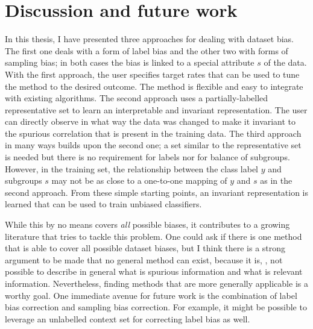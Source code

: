 \chapter{Discussion and future work}\label{ch:conclusion}
In this thesis, I have presented three approaches for dealing with dataset bias.
The first one deals with a form of label bias and the other two with forms of sampling bias;
in both cases the bias is linked to a special attribute \(s\) of the data.
%
%
With the first approach, the user specifies target rates that can be used to tune the method to the desired outcome.
The method is flexible and easy to integrate with existing algorithms.
The second approach uses a partially-labelled representative set to learn an interpretable and invariant representation.
The user can directly observe in what way the data was changed to make it invariant
to the spurious correlation that is present in the training data.
The third approach in many ways builds upon the second one;
a set similar to the representative set is needed but there is no requirement for labels nor for balance of subgroups.
However, in the training set, the relationship between the class label \(y\) and subgroups \(s\) may not be
as close to a one-to-one mapping of \(y\) and \(s\) as in the second approach.
From these simple starting points, an invariant representation is learned
that can be used to train unbiased classifiers.

While this by no means covers \emph{all} possible biases,
it contributes to a growing literature that tries to tackle this problem.
One could ask if there is one method that is able to cover all possible dataset biases,
but I think there is a strong argument to be made that no general method can exist,
because it is, \eg, not possible to describe in general what is spurious information and what is relevant information.
Nevertheless, finding methods that are more generally applicable is a worthy goal.
One immediate avenue for future work is
the combination of label bias correction and sampling bias correction.
For example, it might be possible to leverage an unlabelled context set for correcting label bias as well.


